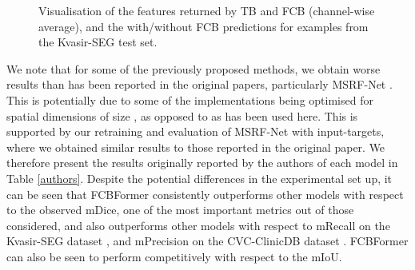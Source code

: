 \documentclass[runningheads]{llncs}
\begin{document}
\begin{figure}[htp]
    \caption{Visualisation of the features returned by TB and FCB (channel-wise average), and the with/without FCB predictions for examples from the Kvasir-SEG \cite{kvasir} test set.}
    \label{fig:example_feats}
\end{figure}

We note that for some of the previously proposed methods, we obtain worse results than has been reported in the  original papers, particularly MSRF-Net \cite{msrfnet}. This is potentially due to some of the implementations being optimised for spatial dimensions of size , as opposed to  as has been used here. This is supported by our retraining and evaluation of MSRF-Net \cite{msrfnet} with  input-targets, where we obtained similar results to those reported in the original paper. We therefore present the results originally reported by the authors of each model in Table \ref{authors}. Despite the potential differences in the experimental set up, it can be seen that FCBFormer consistently outperforms other models with respect to the observed mDice, one of the most important metrics out of those considered, and also outperforms other models with respect to mRecall on the Kvasir-SEG dataset \cite{kvasir}, and mPrecision on the CVC-ClinicDB dataset \cite{cvc}. FCBFormer can also be seen to perform competitively with respect to the mIoU.
\end{document}
